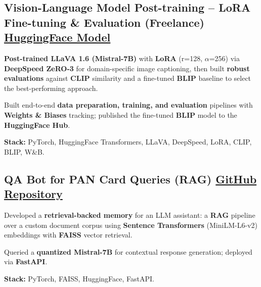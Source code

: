 \documentclass[letter,10pt]{article}
\begin{document}
\subsection{Vision-Language Model Post-training – LoRA Fine-tuning \& Evaluation (Freelance) \hfill \href{https://huggingface.co/sunil448832/blip-model}{HuggingFace Model}}
\begin{zitemize}
\item \textbf{Post-trained LLaVA 1.6 (Mistral-7B)} with \textbf{LoRA} (r=128, $\alpha$=256) via \textbf{DeepSpeed ZeRO-3} for domain-specific image captioning, then built \textbf{robust evaluations} against \textbf{CLIP} similarity and a fine-tuned \textbf{BLIP} baseline to select the best-performing approach.
\item Built end-to-end \textbf{data preparation, training, and evaluation} pipelines with \textbf{Weights \& Biases} tracking; published the fine-tuned \textbf{BLIP} model to the \textbf{HuggingFace Hub}.
\item \textbf{Stack:} PyTorch, HuggingFace Transformers, LLaVA, DeepSpeed, LoRA, CLIP, BLIP, W\&B.
\end{zitemize}

\subsection{QA Bot for PAN Card Queries (RAG) \hfill \href{https://github.com/sunil448832/Natural-Language-Processing/tree/master/RAG(Retrieval\%20Augment\%20Generation)}{GitHub Repository}}
\begin{zitemize}
\item Developed a \textbf{retrieval-backed memory} for an LLM assistant: a \textbf{RAG} pipeline over a custom document corpus using \textbf{Sentence Transformers} (MiniLM-L6-v2) embeddings with \textbf{FAISS} vector retrieval.
\item Queried a \textbf{quantized Mistral-7B} for contextual response generation; deployed via \textbf{FastAPI}.
\item \textbf{Stack:} PyTorch, FAISS, HuggingFace, FastAPI.
\end{zitemize}
\end{document}
